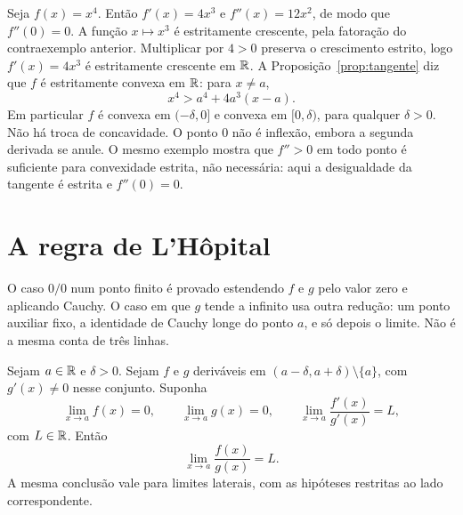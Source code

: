 \documentclass[11pt,a4paper]{article}
\begin{document}
\begin{contraexemplo}[$f''(0)=0$ sem inflexão]
Seja $f(x)=x^4$. Então $f'(x)=4x^3$ e $f''(x)=12x^2$, de modo que $f''(0)=0$. A função $x\mapsto x^3$ é estritamente crescente, pela fatoração do contraexemplo anterior. Multiplicar por $4>0$ preserva o crescimento estrito, logo $f'(x)=4x^3$ é estritamente crescente em $\mathbb{R}$. A Proposição~\ref{prop:tangente} diz que $f$ é estritamente convexa em $\mathbb{R}$: para $x\neq a$,
\[
x^4>a^4+4a^3(x-a).
\]
Em particular $f$ é convexa em $(-\delta,0]$ e convexa em $[0,\delta)$, para qualquer $\delta>0$. Não há troca de concavidade. O ponto $0$ não é inflexão, embora a segunda derivada se anule. O mesmo exemplo mostra que $f''>0$ em todo ponto é suficiente para convexidade estrita, não necessária: aqui a desigualdade da tangente é estrita e $f''(0)=0$.
\end{contraexemplo}


\section{A regra de L'Hôpital}

O caso $0/0$ num ponto finito é provado estendendo $f$ e $g$ pelo valor zero e aplicando Cauchy. O caso em que $g$ tende a infinito usa outra redução: um ponto auxiliar fixo, a identidade de Cauchy longe do ponto $a$, e só depois o limite. Não é a mesma conta de três linhas.

\begin{teorema}\label{teo:lhopital-zero}
Sejam $a\in\mathbb{R}$ e $\delta>0$. Sejam $f$ e $g$ deriváveis em $(a-\delta,a+\delta)\setminus\{a\}$, com $g'(x)\neq 0$ nesse conjunto. Suponha
\[
\lim_{x\to a}f(x)=0,\qquad \lim_{x\to a}g(x)=0,\qquad \lim_{x\to a}\frac{f'(x)}{g'(x)}=L,
\]
com $L\in\mathbb{R}$. Então
\[
\lim_{x\to a}\frac{f(x)}{g(x)}=L.
\]
A mesma conclusão vale para limites laterais, com as hipóteses restritas ao lado correspondente.
\end{teorema}
\end{document}

